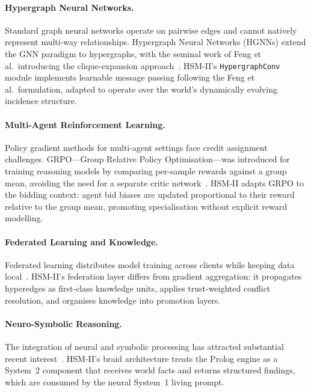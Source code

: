 \documentclass[11pt]{article}
\begin{document}
\paragraph{Hypergraph Neural Networks.}
Standard graph neural networks operate on pairwise edges and cannot natively
represent multi-way relationships. Hypergraph Neural Networks (HGNNs) extend the
GNN paradigm to hypergraphs, with the seminal work of Feng et al.\ introducing
the clique-expansion approach~\cite{bronstein2021geometric}. HSM-II's
\texttt{HypergraphConv} module implements learnable message passing following the
Feng et al.\ formulation, adapted to operate over the world's dynamically evolving
incidence structure.

\paragraph{Multi-Agent Reinforcement Learning.}
Policy gradient methods for multi-agent settings face credit assignment
challenges. GRPO---Group Relative Policy Optimisation---was introduced for training
reasoning models by comparing per-sample rewards against a group mean,
avoiding the need for a separate critic network~\cite{shao2024grpo}. HSM-II adapts
GRPO to the bidding context: agent bid biases are updated proportional to their
reward relative to the group mean, promoting specialisation without explicit reward
modelling.

\paragraph{Federated Learning and Knowledge.}
Federated learning distributes model training across clients while keeping data
local~\cite{konecny2016federated}. HSM-II's federation layer differs from gradient
aggregation: it propagates hyperedges as first-class knowledge units, applies
trust-weighted conflict resolution, and organises knowledge into promotion layers.

\paragraph{Neuro-Symbolic Reasoning.}
The integration of neural and symbolic processing has attracted substantial recent
interest~\cite{garcez2009neural,mao2019neuro}. HSM-II's braid architecture treats
the Prolog engine as a System~2 component that receives world facts and returns
structured findings, which are consumed by the neural System~1 living prompt.
\end{document}
